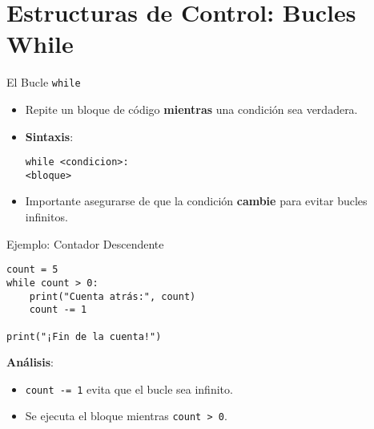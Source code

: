 \documentclass[10pt]{beamer}
\begin{document}
\section{Estructuras de Control: Bucles While}

\begin{frame}{El Bucle \texttt{while}}
  \begin{itemize}
    \item Repite un bloque de código \textbf{mientras} una condición sea verdadera.
    \item \textbf{Sintaxis}:

\texttt{while <condicion>:} \\
\quad \texttt{<bloque>}

    \item Importante asegurarse de que la condición \textbf{cambie} para evitar bucles infinitos.
  \end{itemize}
\end{frame}

\begin{frame}[fragile]{Ejemplo: Contador Descendente}
\begin{verbatim}
count = 5
while count > 0:
    print("Cuenta atrás:", count)
    count -= 1

print("¡Fin de la cuenta!")
\end{verbatim}
\textbf{Análisis}:
\begin{itemize}
  \item \texttt{count -= 1} evita que el bucle sea infinito.
  \item Se ejecuta el bloque mientras \texttt{count > 0}.
\end{itemize}
\end{frame}
\end{document}
